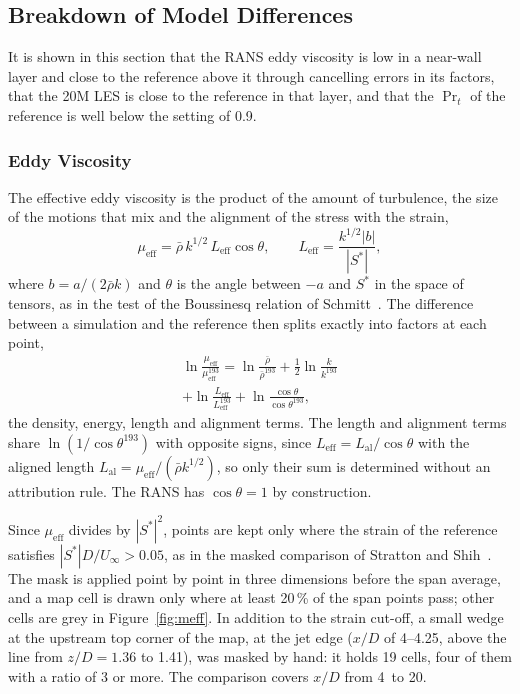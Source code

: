 \documentclass[colorlinks,upint,subscriptcorrection,varvw,hyphenate,balance,lineno]{asmeconf}
\newcommand*{\meff}{\mu_{\mathrm{eff}}}
\newcommand*{\Leff}{L_{\mathrm{eff}}}
\newcommand*{\Lal}{L_{\mathrm{al}}}
\newcommand*{\Uinf}{U_\infty}
\newcommand*{\xEVstart}{4}%
\newcommand*{\fEVmin}{20}%
\begin{document}
\subsection{Breakdown of Model Differences}\label{sec:breakdown}

It is shown in this section that the RANS eddy viscosity is low in a near-wall layer and close to the reference
above it through cancelling errors in its factors, that the 20M LES is close to the reference in that layer, and
that the $\Pr_t$ of the reference is well below the setting
of 0.9.

\subsubsection{Eddy Viscosity}

The effective eddy viscosity is the product of the amount of turbulence, the size of the motions that mix and
the alignment of the stress with the strain,
\begin{equation}\label{eq:factors}
\meff=\bar\rho\,k^{1/2}\,\Leff\cos\theta,\qquad \Leff=\frac{k^{1/2}|b|}{|S^*|},
\end{equation}
where $b=a/(2\bar\rho k)$ and $\theta$ is the angle between $-a$ and $S^*$ in the space of tensors, as in the test
of the Boussinesq relation of Schmitt~\cite{schmitt2007}. The difference between a simulation and the reference
then splits exactly into factors at each point,
\begin{multline}\label{eq:logsplit}
\ln\frac{\meff}{\meff^{193}}=\ln\frac{\bar\rho}{\bar\rho^{193}}+\tfrac12\ln\frac{k}{k^{193}}\\
+\ln\frac{\Leff}{\Leff^{193}}+\ln\frac{\cos\theta}{\cos\theta^{193}},
\end{multline}
the density, energy, length and alignment terms. The length and alignment terms share
$\ln(1/\cos\theta^{193})$ with opposite signs, since $\Leff=\Lal/\cos\theta$ with the aligned length
$\Lal=\meff/(\bar\rho k^{1/2})$, so only their sum is determined without an attribution rule. The RANS has
$\cos\theta=1$ by construction.

Since $\meff$ divides by $|S^*|^2$, points are kept only where the strain of the reference satisfies
$|S^*|D/\Uinf>0.05$, as in the masked comparison of Stratton and Shih~\cite{stratton2019}. The mask is applied point
by point in three dimensions before the span average, and a map cell is drawn only where at least \fEVmin\,\% of
the span points pass; other cells are grey in Figure~\ref{fig:meff}. In addition to the strain cut-off, a small
wedge at the upstream top corner of the map, at the jet edge ($x/D$ of 4--4.25, above the line from $z/D=1.36$ to
1.41), was masked by hand: it holds 19 cells, four of them with a ratio of 3 or more. The comparison covers $x/D$
from \xEVstart\ to 20.
\end{document}

